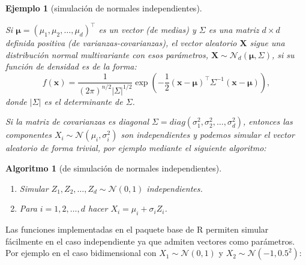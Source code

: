 \documentclass[
  spanish,
  10pt,
]{book}
\renewcommand{\boldsymbol}[1]{\symbf{#1}}
\renewcommand{\mathbf}[1]{\symbf{#1}}
\theoremstyle{break}
\newtheorem{conjecture}{Algoritmo}[chapter]
\newtheorem{example}{Ejemplo}[chapter]
\theoremstyle{nonumberplain}
\begin{document}
\begin{example}[simulación de normales independientes]
\protect\hypertarget{exm:normind}{}\label{exm:normind}

Si \(\boldsymbol{\mu} = \left( \mu_1, \mu_2, \ldots, \mu_d \right)^{\top}\) es un vector (de medias) y \(\Sigma\) es una matriz \(d \times d\) definida positiva (de varianzas-covarianzas), el vector aleatorio \(\mathbf{X}\) sigue una distribución normal multivariante con esos parámetros,
\(\mathbf{X} \sim \mathcal{N}_d\left( \boldsymbol{\mu},\Sigma \right)\),
si su función de densidad es de la forma:
\[f(\mathbf x) = \frac{1}{(2\pi)^{n/2}|\Sigma|^{1/2}}
\exp \left( -\frac{1}{2} ( \mathbf x - \boldsymbol \mu)^{\top} \Sigma^{-1} (\mathbf x - \boldsymbol \mu)
\right),\]
donde \(| \Sigma |\) es el determinante de \(\Sigma\).

Si la matriz de covarianzas es diagonal \(\Sigma=diag\left( \sigma_1^2,\sigma_2^2,\ldots,\sigma_d^2\right)\),
entonces las componentes \(X_i \sim \mathcal{N}\left( \mu_i,\sigma_i^2\right)\)
son independientes y podemos simular el vector aleatorio de forma trivial, por ejemplo mediante el siguiente algoritmo:
\end{example}

\begin{conjecture}[de simulación de normales independientes]
\protect\hypertarget{cnj:mnorm-indep}{}\label{cnj:mnorm-indep}

\begin{enumerate}
\def\labelenumi{\arabic{enumi}.}
\item
  Simular \(Z_1, Z_2, \ldots, Z_d \sim \mathcal{N} \left( 0, 1 \right)\) independientes.
\item
  Para \(i = 1, 2, \ldots, d\) hacer \(X_i = \mu_i + \sigma_i Z_i\).
\end{enumerate}

\end{conjecture}

Las funciones implementadas en el paquete base de R permiten simular fácilmente en el caso independiente ya que admiten vectores como parámetros.
Por ejemplo en el caso bidimensional con \(X_1 \sim \mathcal{N}\left( 0, 1\right)\) y \(X_2 \sim \mathcal{N}\left( -1, 0.5^2 \right)\):
\end{document}
